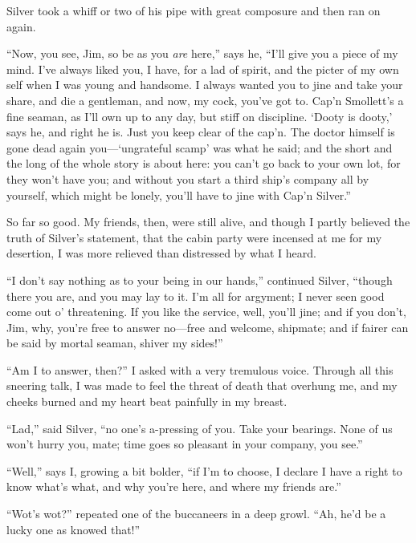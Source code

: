 Silver took a whiff or two of his pipe with great composure and then ran on again.

\enquote{Now, you see, Jim, so be as you \textit{are} here,} says he, \enquote{I’ll give you a piece of my mind. I’ve always liked you, I have, for a lad of spirit, and the picter of my own self when I was young and handsome. I always wanted you to jine and take your share, and die a gentleman, and now, my cock, you’ve got to. Cap’n Smollett’s a fine seaman, as I’ll own up to any day, but stiff on discipline. ‘Dooty is dooty,’ says he, and right he is. Just you keep clear of the cap’n. The doctor himself is gone dead again you---‘ungrateful scamp’ was what he said; and the short and the long of the whole story is about here: you can’t go back to your own lot, for they won’t have you; and without you start a third ship’s company all by yourself, which might be lonely, you’ll have to jine with Cap’n Silver.}

So far so good. My friends, then, were still alive, and though I partly believed the truth of Silver’s statement, that the cabin party were incensed at me for my desertion, I was more relieved than distressed by what I heard.

\enquote{I don’t say nothing as to your being in our hands,} continued Silver, \enquote{though there you are, and you may lay to it. I’m all for argyment; I never seen good come out o’ threatening. If you like the service, well, you’ll jine; and if you don’t, Jim, why, you’re free to answer no---free and welcome, shipmate; and if fairer can be said by mortal seaman, shiver my sides!}

\enquote{Am I to answer, then?} I asked with a very tremulous voice. Through all this sneering talk, I was made to feel the threat of death that overhung me, and my cheeks burned and my heart beat painfully in my breast.

\enquote{Lad,} said Silver, \enquote{no one’s a-pressing of you. Take your bearings. None of us won’t hurry you, mate; time goes so pleasant in your company, you see.}

\enquote{Well,} says I, growing a bit bolder, \enquote{if I’m to choose, I declare I have a right to know what’s what, and why you’re here, and where my friends are.}

\enquote{Wot’s wot?} repeated one of the buccaneers in a deep growl. \enquote{Ah, he’d be a lucky one as knowed that!}

